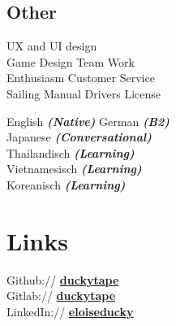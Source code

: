 \documentclass[a4paper]{deedy-resume_twopage} %
\begin{document}
\begin{minipage}[t]{0.33\textwidth}
  \sectionspace

  \subsection{Other}
  \textbullet{} UX and UI design \\
  \textbullet{} Game Design \textbullet{} Team Work \\
  \textbullet{} Enthusiasm \textbullet{} Customer Service \\
  \textbullet{} Sailing \textbullet{} Manual Drivers License\\

  \sectionspace

  \textbullet{} English {\footnotesize \textit{\textbf{(Native)}}} \textbullet{} German {\footnotesize \textit{\textbf{(B2)}}} \\
  \textbullet{} Japanese {\footnotesize \textit{\textbf{(Conversational)}}} \\
  \textbullet{} Thailandisch {\footnotesize \textit{\textbf{(Learning)}}} \\
  \textbullet{} Vietnamesisch {\footnotesize \textit{\textbf{(Learning)}}} \\
  \textbullet{} Koreanisch {\footnotesize \textit{\textbf{(Learning)}}} \\


  \sectionspace %

  \sectionspace
  \section{Links}

  Github:// \href{https://github.com/duckytape}{\bf duckytape} \\
  Gitlab:// \href{https://gitlab.com/duckytape} {\bf duckytape} \\
  LinkedIn:// \href{https://www.linkedin.com/in/eloiseducky}{\bf eloiseducky} \\

  \sectionspace %



\end{minipage} %
\end{document}
